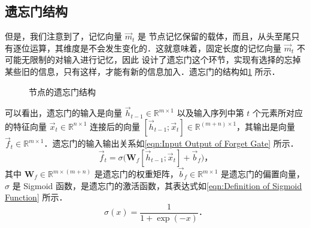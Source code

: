 \subsection{\lstm{} 遗忘门结构}
但是，我们注意到了，记忆向量 $\vec{m}_t$ 是 \lstm{} 节点记忆保留的载体，而且，从头至尾只有逐位运算，其维度是不会发生变化的．这就意味着，固定长度的记忆向量 $\vec{m}_t$ 不可能无限制的对输入进行记忆，因此 \lstm{} 设计了遗忘门这个环节，实现有选择的忘掉某些旧的信息，只有这样，才能有新的信息加入．遗忘门的结构如\cref{fig:Forget Gate of LSTM} 所示．%
%
\begin{figure}[!htb]
  \centering
  \scalebox{0.7}{}
  \caption{\lstm{} 节点的遗忘门结构}
  \label{fig:Forget Gate of LSTM}
\end{figure}%
%
可以看出，遗忘门的输入是向量 $\vec{h}_{t-1}\in\mathbb{R}^{m\times 1}$ 以及输入序列中第 $t$ 个元素所对应的特征向量 $\vec{x}_t\in\mathbb{R}^{n\times 1}$ 连接后的向量 $[\vec{h}_{t-1};\vec{x}_t]\in\mathbb{R}^{(m+n)\times 1}$，其输出是向量 $\vec{f}_t\in\mathbb{R}^{m\times 1}$．遗忘门的输入输出关系如\cref{eqn:Input Output of Forget Gate} 所示．%
%
\begin{equation}\label{eqn:Input Output of Forget Gate}
  \vec{f}_t = \sigma\big(\bm{W}_f[\vec{h}_{t-1};\vec{x}_t] + \vec{b}_f\big)\text{，}
\end{equation}%
%
其中 $\bm{W}_f\in\mathbb{R}^{m\times (m+n)}$ 是遗忘门的权重矩阵，$\vec{b}_f\in\mathbb{R}^{m\times 1}$ 是遗忘门的偏置向量，$\sigma$ 是 Sigmoid 函数，是遗忘门的激活函数，其表达式如\cref{eqn:Definition of Sigmoid Function} 所示．%
%
\begin{equation}\label{eqn:Definition of Sigmoid Function}
  \sigma(x) = \frac{1}{1+\exp(-x)}\text{．}
\end{equation}

